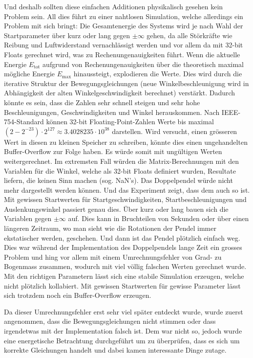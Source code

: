 \documentclass[titlepage, 11pt, a4paper, ngerman]{article}
\begin{document}
Und deshalb sollten diese einfachen Additionen physikalisch gesehen kein Problem sein. All dies führt zu einer nahtlosen Simulation, welche allerdings ein Problem mit sich bringt: Die Gesamtenergie des Systems wird je nach Wahl der Startparameter über kurz oder lang gegen $\pm\infty$ gehen, da alle Störkräfte wie Reibung und Luftwiderstand vernachlässigt werden und vor allem da mit 32-bit \glspl{Float} gerechnet wird, was zu Rechenungenauigkeiten führt. Wenn die aktuelle Energie $E_{\text{tot}}$ aufgrund von Rechenungenauigkeiten über die theoretisch maximal mögliche Energie $E_{\text{max}}$ hinaussteigt, explodieren die Werte. Dies wird durch die iterative Struktur der Bewegungsgleichungen (neue Winkelbeschleunigung wird in Abhängigkeit der alten Winkelgeschwindigkeit berechnet) verstärkt. Dadurch könnte es sein, dass die Zahlen sehr schnell steigen und sehr hohe Beschleunigungen, Geschwindigkeiten und Winkel herauskommen. Nach IEEE-754-Standard können 32-bit \gls{Floating-Point}-Zahlen Werte bis maximal $(2 - 2^{-23}) \cdot 2^{127} \approx 3.4028235 \cdot 10^{38}$ darstellen. Wird versucht, einen grösseren Wert in diesen zu kleinen Speicher zu schreiben, könnte dies einen ungehandelten Buffer-Overflow zur Folge haben. Es würde somit mit ungültigen Werten weitergerechnet. Im extremsten Fall würden die Matrix-Berechnungen mit den Variablen für die Winkel, welche als 32-bit \glspl{Float} definiert wurden, Resultate liefern, die keinen Sinn machen (sog. \acrshort{NaN}'s). Das Doppelpendel würde nicht mehr dargestellt werden können. Und das Experiment zeigt, dass dem auch so ist. Mit gewissen Startwerten für Startgeschwindigkeiten, Startbeschleunigungen und Auslenkungswinkel passiert genau dies. Über kurz oder lang bauen sich die Variablen gegen $\pm\infty$ auf. Dies kann in Bruchteilen von Sekunden oder über einen längeren Zeitraum, wo man sieht wie die Rotationen der Pendel immer ekstatischer werden, geschehen. Und dann ist das Pendel plötzlich einfach weg. Dies war während der Implementation des Doppelpendels lange Zeit ein grosses Problem und hing vor allem mit einem Umrechnungsfehler von Grad- zu Bogenmass zusammen, wodurch mit viel völlig falschen Werten gerechnet wurde. Mit den richtigen Parametern lässt sich eine stabile Simulation erzeugen, welche nicht plötzlich kollabiert. Mit gewissen Startwerten für gewisse Parameter lässt sich trotzdem noch ein Buffer-Overflow erzeugen.\par
Da dieser Umrechnungsfehler erst sehr viel später entdeckt wurde, wurde zuerst angenommen, dass die Bewegungsgleichungen nicht stimmen oder dass irgendetwas mit der Implementation falsch ist. Dem war nicht so, jedoch wurde eine energetische Betrachtung durchgeführt um zu überprüfen, dass es sich um korrekte Gleichungen handelt und dabei kamen interessante Dinge zutage.
\end{document}
